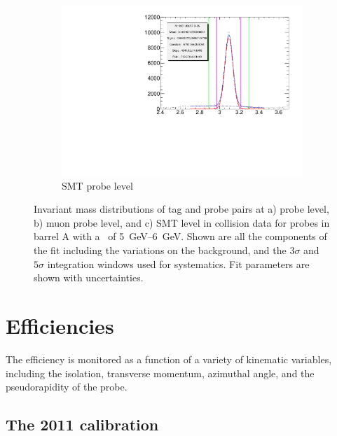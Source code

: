 \begin{figure}[thbp]
    \begin{subfigure}[b]{0.54\textwidth}
      \includegraphics[width=\textwidth]{PartCalibration2012/Plots/Kinematics/Data_InvMass_pt_5_6_barrel_smt.pdf}
      \caption{SMT probe level}   
    \end{subfigure}
    \caption[Invariant mass distributions of tag and probe pairs at probe level, muon probe level, and SMT level in collision data for probes in barrel A with a \pt\ of {\SIrange[range-units=single]{5}{6}{\GeV}}.]{Invariant mass distributions of tag and probe pairs at a) probe level, b) muon probe level, and c) SMT level in collision data for probes in barrel A with a \pt\ of \SIrange[range-units=single]{5}{6}{\GeV}. Shown are all the components of the fit including the variations on the background, and the $3\sigma$ and $5\sigma$ integration windows used for systematics. Fit parameters are shown with uncertainties.}\label{fig:CalibrationFittingResult}
\end{figure}

\section{Efficiencies}\label{sec:CalibrationEfficiencies}

The efficiency is monitored as a function of a variety of kinematic variables, including the isolation, transverse momentum, azimuthal angle, and the pseudorapidity of the probe.

\subsection{The 2011 calibration}

